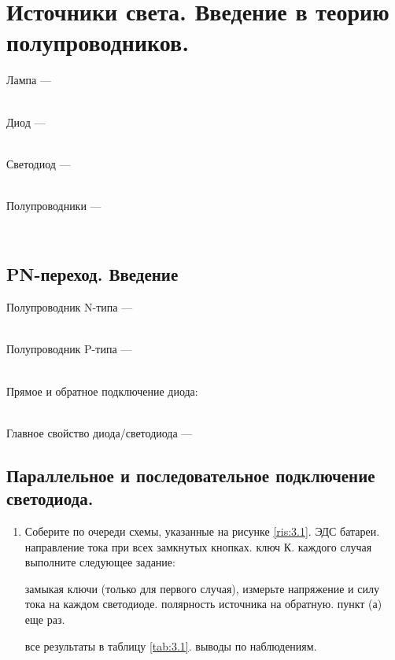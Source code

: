 \section{Источники света. Введение в теорию полупроводников.}
Лампа --- \hrulefill

\hrulefill

\hrulefill
\\
Диод --- \hrulefill

\hrulefill

\hrulefill
\\
Светодиод --- \hrulefill

\hrulefill

\hrulefill\\
Полупроводники --- \hrulefill

\hrulefill
\\



\subsection{PN-переход. Введение}

Полупроводник N-типа --- \hrulefill

\hrulefill
\\
Полупроводник P-типа --- \hrulefill

\hrulefill
\\
Прямое и обратное подключение диода:

\\
Главное свойство диода/светодиода --- \hrulefill

\hrulefill

\subsection{Параллельное и последовательное подключение светодиода.}

\begin{enumerate}
    \item Соберите по очереди схемы, указанные на рисунке \ref{ris:3.1}.
     ЭДС батареи.
     направление тока при всех замкнутых кнопках.
     ключ К.
     каждого случая выполните следующее задание:
    \begin{enumerate}
         замыкая ключи (только для первого случая), измерьте напряжение и силу тока на каждом светодиоде.
     полярность источника на обратную.
     пункт (а) еще раз.
    \end{enumerate}
     все результаты в таблицу \ref{tab:3.1}.
     выводы по наблюдениям.
    
\end{enumerate}


